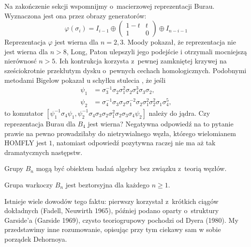 Na zakończenie sekcji wspomnijmy o~macierzowej reprezentacji Burau.
Wyznaczona jest ona przez obrazy generatorów:
\begin{equation}
    \varphi(\sigma_i) = I_{i-1} \oplus \begin{pmatrix}
        1-t & t \\
        1   & 0
    \end{pmatrix} \oplus I_{n-i-1}
\end{equation}
Reprezentacja $\varphi$ jest wierna dla $n = 2, 3$.
Moody pokazał, że reprezentacja nie jest wierna dla $n > 8$, Long, Paton ulepszyli jego podejście i otrzymali mocniejszą nierównosć $n > 5$.
Ich kontrukcja korzysta z~pewnej zamkniętej krzywej na sześciokrotnie przekłutym dysku o~pewnych cechach homologicznych.
Podobnymi metodami Bigelow pokazał u schyłku stulecia \cite{bigelow99}, że jeśli
\begin{align}
    \psi_1 & = \sigma_3^{{-1}}\sigma_2\sigma_1^2\sigma_2\sigma_4^3\sigma_3\sigma_2, \\
\psi_2 & = \sigma_4^{{-1}}\sigma_3\sigma_2\sigma_1^{{-2}}\sigma_2\sigma_1^2\sigma_2^2\sigma_1\sigma_4^5,
\end{align}
to komutator $[\psi_1^{{-1}}\sigma_4\psi_1,\psi_2^{{-1}}\sigma_4\sigma_3\sigma_2\sigma_1^2\sigma_2\sigma_3\sigma_4\psi_2]$ należy do jądra.
Czy reprezentacja Burau dla $B_4$ jest wierna?
Negatywna odpowiedź na to pytanie prawie na pewno prowadziłaby do
nietrywialnego węzła, którego wielomianem HOMFLY jest $1$,
natomiast odpowiedź pozytywna raczej nie ma aż tak dramatycznych następstw.

Grupy $B_n$ mogą być obiektem badań algebry bez związku z~teorią węzłów.

\begin{proposition}
    Grupa warkoczy $B_n$ jest beztorsyjna dla każdego $n \ge 1$.
\end{proposition}

Istnieje wiele dowodów tego faktu: pierwszy korzystał z~krótkich ciągów dokładnych (Fadell, Neuwirth 1965), później podano oparty o~struktury Garside'a (Garside 1969), czysto teoriogrupowy pochodzi od Dyera (1980).
My przedstawimy inne rozumowanie, opisując przy tym ciekawy sam w sobie porządek Dehornoya.

